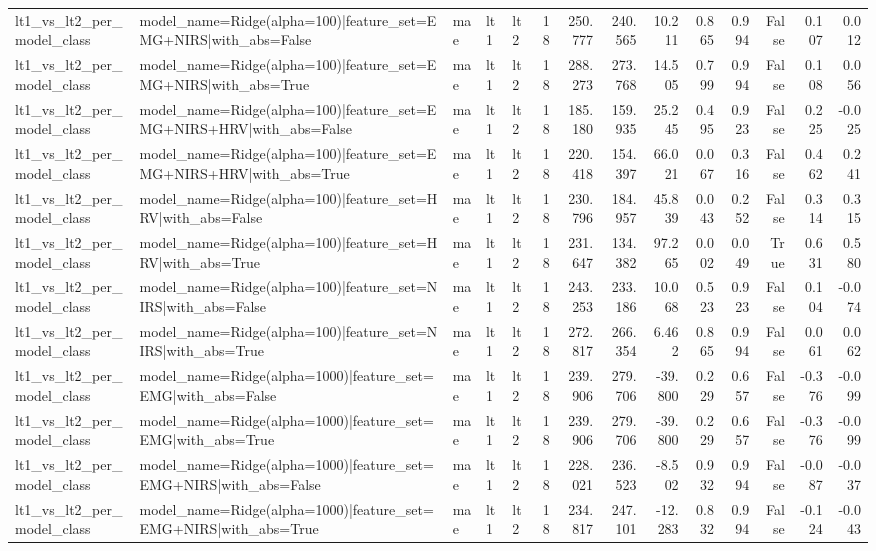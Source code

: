 \begin{table}
\begin{tabular}{lllllrrrrrrrrr}
lt1_vs_lt2_per_model_class & model_name=Ridge(alpha=100)|feature_set=EMG+NIRS|with_abs=False & mae & lt1 & lt2 & 18 & 250.777 & 240.565 & 10.211 & 0.865 & 0.994 & False & 0.107 & 0.012 \\
lt1_vs_lt2_per_model_class & model_name=Ridge(alpha=100)|feature_set=EMG+NIRS|with_abs=True & mae & lt1 & lt2 & 18 & 288.273 & 273.768 & 14.505 & 0.799 & 0.994 & False & 0.108 & 0.056 \\
lt1_vs_lt2_per_model_class & model_name=Ridge(alpha=100)|feature_set=EMG+NIRS+HRV|with_abs=False & mae & lt1 & lt2 & 18 & 185.180 & 159.935 & 25.245 & 0.495 & 0.923 & False & 0.225 & -0.025 \\
lt1_vs_lt2_per_model_class & model_name=Ridge(alpha=100)|feature_set=EMG+NIRS+HRV|with_abs=True & mae & lt1 & lt2 & 18 & 220.418 & 154.397 & 66.021 & 0.067 & 0.316 & False & 0.462 & 0.241 \\
lt1_vs_lt2_per_model_class & model_name=Ridge(alpha=100)|feature_set=HRV|with_abs=False & mae & lt1 & lt2 & 18 & 230.796 & 184.957 & 45.839 & 0.043 & 0.252 & False & 0.314 & 0.315 \\
lt1_vs_lt2_per_model_class & model_name=Ridge(alpha=100)|feature_set=HRV|with_abs=True & mae & lt1 & lt2 & 18 & 231.647 & 134.382 & 97.265 & 0.002 & 0.049 & True & 0.631 & 0.580 \\
lt1_vs_lt2_per_model_class & model_name=Ridge(alpha=100)|feature_set=NIRS|with_abs=False & mae & lt1 & lt2 & 18 & 243.253 & 233.186 & 10.068 & 0.523 & 0.923 & False & 0.104 & -0.074 \\
lt1_vs_lt2_per_model_class & model_name=Ridge(alpha=100)|feature_set=NIRS|with_abs=True & mae & lt1 & lt2 & 18 & 272.817 & 266.354 & 6.462 & 0.865 & 0.994 & False & 0.061 & 0.062 \\
lt1_vs_lt2_per_model_class & model_name=Ridge(alpha=1000)|feature_set=EMG|with_abs=False & mae & lt1 & lt2 & 18 & 239.906 & 279.706 & -39.800 & 0.229 & 0.657 & False & -0.376 & -0.099 \\
lt1_vs_lt2_per_model_class & model_name=Ridge(alpha=1000)|feature_set=EMG|with_abs=True & mae & lt1 & lt2 & 18 & 239.906 & 279.706 & -39.800 & 0.229 & 0.657 & False & -0.376 & -0.099 \\
lt1_vs_lt2_per_model_class & model_name=Ridge(alpha=1000)|feature_set=EMG+NIRS|with_abs=False & mae & lt1 & lt2 & 18 & 228.021 & 236.523 & -8.502 & 0.932 & 0.994 & False & -0.087 & -0.037 \\
lt1_vs_lt2_per_model_class & model_name=Ridge(alpha=1000)|feature_set=EMG+NIRS|with_abs=True & mae & lt1 & lt2 & 18 & 234.817 & 247.101 & -12.283 & 0.832 & 0.994 & False & -0.124 & -0.043 \\

\end{tabular}
\end{table}
